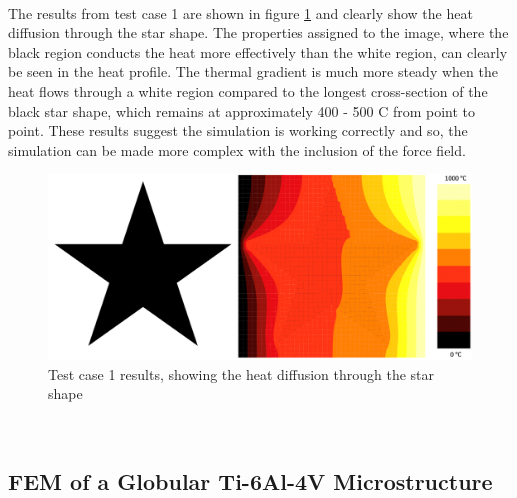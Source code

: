 \documentclass[report.tex]{subfiles}
\begin{document}
\\
The results from test case 1 are shown in figure \ref{fig:TestCase1Results} and clearly show the heat diffusion through the star shape. The properties assigned to the image, where the black region conducts the heat more effectively than the white region, can clearly be seen in the heat profile. The thermal gradient is much more steady when the heat flows through a white region compared to the longest cross-section of the black star shape, which remains at approximately 400 - 500 \degree C from point to point. These results suggest the simulation is working correctly and so, the simulation can be made more complex with the inclusion of the force field.
\\
\begin{figure}[h]
    \centering
    \includegraphics[width=14cm]{TestCase1_Simulation_Results.png}
    \caption{Test case 1 results, showing the heat diffusion through the star shape}
    \label{fig:TestCase1Results}
\end{figure}
\\

\subsection{FEM of a Globular Ti-6Al-4V Microstructure}
\end{document}
